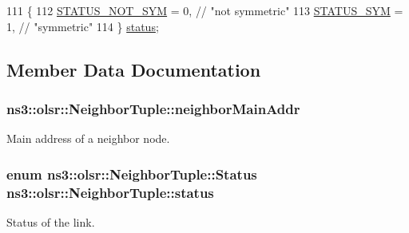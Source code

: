 \begin{DoxyCode}
111   \{
112     \hyperlink{structns3_1_1olsr_1_1NeighborTuple_ad4b623edaedb3a5244291c738ce87e12ab633cfd28c2ec5d1f2b6deec3c7ebcf9}{STATUS\_NOT\_SYM} = 0, \textcolor{comment}{// "not symmetric"}
113     \hyperlink{structns3_1_1olsr_1_1NeighborTuple_ad4b623edaedb3a5244291c738ce87e12a1649b9e4d61ac6e27eff65e8bd5dfe15}{STATUS\_SYM} = 1, \textcolor{comment}{// "symmetric"}
114   \} \hyperlink{structns3_1_1olsr_1_1NeighborTuple_a893b70912d3bd7b437b493e4cb09f738}{status}; 
\end{DoxyCode}


\subsection{Member Data Documentation}
\subsubsection[{\texorpdfstring{neighbor\+Main\+Addr}{neighborMainAddr}}]{ ns3\+::olsr\+::\+Neighbor\+Tuple\+::neighbor\+Main\+Addr}\hypertarget{structns3_1_1olsr_1_1NeighborTuple_a440b6b245ad919cd4023836246519106}{}\label{structns3_1_1olsr_1_1NeighborTuple_a440b6b245ad919cd4023836246519106}


Main address of a neighbor node. 

\subsubsection[{\texorpdfstring{status}{status}}]{\setlength{\rightskip}{0pt plus 5cm}enum {\bf ns3\+::olsr\+::\+Neighbor\+Tuple\+::\+Status}  ns3\+::olsr\+::\+Neighbor\+Tuple\+::status}\hypertarget{structns3_1_1olsr_1_1NeighborTuple_a893b70912d3bd7b437b493e4cb09f738}{}\label{structns3_1_1olsr_1_1NeighborTuple_a893b70912d3bd7b437b493e4cb09f738}
Status of the link. 
